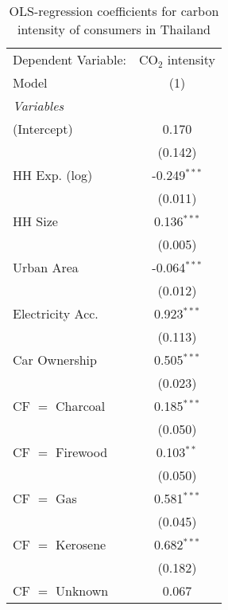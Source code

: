 
\begin{table}[htbp!]
   \centering
   \small
   \begin{adjustbox}{width = 1\textwidth, max height = 0.95\textheight, center}
      \begin{threeparttable}[b]
         \caption{\label{tab:OLS_1_THA} OLS-regression coefficients for carbon intensity of consumers in Thailand}
         \begin{tabular}{lc}
            \tabularnewline \midrule \midrule
            Dependent Variable: & CO$_{2}$ intensity\\  
            Model               & (1)\\  
            \midrule
            \emph{Variables}\\
            (Intercept)         & 0.170\\   
                                & (0.142)\\   
            HH Exp. (log)       & -0.249$^{***}$\\   
                                & (0.011)\\   
            HH Size             & 0.136$^{***}$\\   
                                & (0.005)\\   
            Urban Area          & -0.064$^{***}$\\   
                                & (0.012)\\   
            Electricity Acc.    & 0.923$^{***}$\\   
                                & (0.113)\\   
            Car Ownership       & 0.505$^{***}$\\   
                                & (0.023)\\   
            CF $=$ Charcoal     & 0.185$^{***}$\\   
                                & (0.050)\\   
            CF $=$ Firewood     & 0.103$^{**}$\\   
                                & (0.050)\\   
            CF $=$ Gas          & 0.581$^{***}$\\   
                                & (0.045)\\   
            CF $=$ Kerosene     & 0.682$^{***}$\\   
                                & (0.182)\\   
            CF $=$ Unknown      & 0.067\\   

\end{tabular}
\end{threeparttable}
\end{adjustbox}
\end{table}
